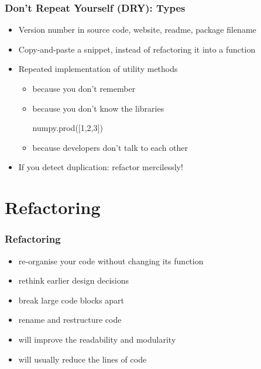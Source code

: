 \documentclass{beamer}
\begin{document}

\begin{frame}[fragile]
 \frametitle{Don't Repeat Yourself (DRY): Types}
\begin{example}
\begin{itemize}
  \item Version number in source code, website, readme, package filename
  \item Copy-and-paste a snippet, instead of refactoring it into a function
  \item Repeated implementation of utility methods 
  \begin{itemize}
   \item because you don't remember
   \item because you don't know the libraries\begin{pycode}
numpy.prod([1,2,3])
\end{pycode}
   \item \alert<2>{because developers don't talk to each other}
  \end{itemize}
\end{itemize}
\end{example}
  
\begin{itemize}
  \item If you detect duplication: refactor mercilessly!
\end{itemize}

\end{frame}


\section{Refactoring}


\begin{frame}
 \frametitle{Refactoring}
 
\begin{itemize}
  \item re-organise your code without changing its function
\end{itemize}

\begin{itemize}
  \item rethink earlier design decisions
  \item break large code blocks apart
  \item rename and restructure code
\end{itemize}

\begin{itemize}
  \item will improve the readability and modularity
  \item will usually reduce the lines of code
\end{itemize}

\end{frame}
\end{document}
